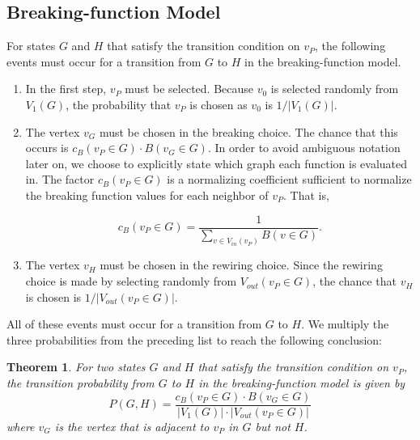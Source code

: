 \documentclass[a4paper,10pt]{article}
\newtheorem{theorem}{Theorem}
\begin{document}
\subsection{Breaking-function Model}

For states $G$ and $H$ that satisfy the transition condition on $v_P$, the following events must occur for a transition from $G$ to $H$ in the breaking-function model.

\begin{enumerate}
 \item In the first step, $v_P$ must be selected. Because $v_0$ is selected randomly from $V_1(G)$, the probability that $v_P$ is chosen as $v_0$ is $1 / |V_1(G)|$.
 \item The vertex $v_G$ must be chosen in the breaking choice. The chance that this occurs is $c_B(v_P \in G) \cdot B(v_G \in G)$. In order to avoid ambiguous notation later on, we choose to explicitly state which graph each function is evaluated in. The factor $c_B(v_P \in G)$ is a normalizing coefficient sufficient to normalize the breaking function values for each neighbor of $v_P$. That is,

   \begin{equation}
    c_B(v_P \in G) = \frac{1}{\sum \limits_{v \in V_{in}(v_P)} B(v \in G)}.
   \end{equation}


 \item The vertex $v_H$ must be chosen in the rewiring choice. Since the rewiring choice is made by selecting randomly from $V_{out}(v_P \in G)$, the chance that $v_H$ is chosen is $1 / |V_{out}(v_P \in G)|$.  
\end{enumerate}

All of these events must occur for a transition from $G$ to $H$. We multiply the three probabilities from the preceding list to reach the following conclusion:

\begin{theorem}
\label{thm:breaking-trans-prob}
For two states $G$ and $H$ that satisfy the transition condition on $v_P$, the transition probability from $G$ to $H$ in the breaking-function model is given by
\begin{equation}
\label{eqn:breaking-trans-prob}
P(G, H) = \frac{c_B(v_P \in G) \cdot B(v_G \in G)}{|V_1(G)| \cdot |V_{out}(v_P \in G)|}
\end{equation}
where $v_G$ is the vertex that is adjacent to $v_P$ in $G$ but not $H$.
\end{theorem}
\end{document}
